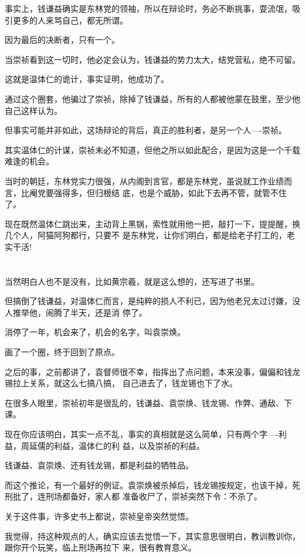 \documentclass[11pt,a4paper,onecolumn]{article}
\begin{document}
事实上，钱谦益确实是东林党的领袖，所以在辩论时，务必不断挑事，耍流氓，吸引更多的人来骂自己，都无所谓。

因为最后的决断者，只有一个。

当崇祯看到这一切时，他必定会认为，钱谦益的势力太大，结党营私，绝不可留。

这就是温体仁的诡计，事实证明，他成功了。

通过这个圈套，他骗过了崇祯，除掉了钱谦益，所有的人都被他蒙在鼓里，至少他自己这样认为。

但事实可能并非如此，这场辩论的背后，真正的胜利者，是另一个人----崇祯。

其实温体仁的计谋，崇祯未必不知道，但他之所以如此配合，是因为这是一个千载难逢的机会。

当时的朝廷，东林党实力很强，从内阁到言官，都是东林党，虽说就工作业绩而言，比阉党要强得多，但归根结
底，也是个威胁，如此下去再不管，就管不住了。

现在既然温体仁跳出来，主动背上黑锅，索性就用他一把，敲打一下，提提醒，换几个人，阿猫阿狗都行，只要不
是东林党，让你们明白，都是给老子打工的，老实干活!

\section[\thesection]{}

当然明白人也不是没有，比如黄宗羲，就是这么想的，还写进了书里。

但搞倒了钱谦益，对温体仁而言，是纯粹的损人不利已，因为他老兄太过讨嫌，没人推举他，闹腾了半天，还是消
停了。

消停了一年，机会来了，机会的名字，叫袁崇焕。

画了一个圈，终于回到了原点。

之后的事，之前都讲了，袁督师很不幸，指挥出了点问题，本来没事，偏偏和钱龙锡拉上关系，就这么七搞八搞，
自己进去了，钱龙锡也下了水。

在很多人眼里，崇祯初年是很乱的，钱谦益、袁崇焕、钱龙锡、作弊、通敌、下课。

现在你应该明白，其实一点不乱，事实的真相就是这么简单，只有两个字----利益，周延儒的利益，温体仁的利
益，以及崇祯的利益。

钱谦益、袁崇焕、还有钱龙锡，都是利益的牺牲品。

而这个推论，有一个最好的例证。袁崇焕被杀掉后，钱龙锡按规定，也该干掉，死刑批了，连刑场都备好，家人都
准备收尸了，崇祯突然下令：不杀了。

关于这件事，许多史书上都说，崇祯皇帝突然觉悟。

我觉得，持这种观点的人，确实应该去觉悟一下，其实意思很明白，教训教训你，跟你开个玩笑，临上刑场再拉下
来，很有教育意义。
\end{document}
